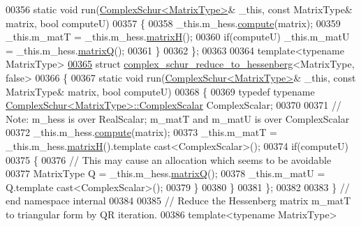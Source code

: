 \begin{DoxyCode}
00356   \textcolor{keyword}{static} \textcolor{keywordtype}{void} run(\hyperlink{group___eigenvalues___module}{ComplexSchur<MatrixType>}& \_this, \textcolor{keyword}{const} MatrixType& matrix, \textcolor{keywordtype}{bool} 
      computeU)
00357   \{
00358     \_this.m\_hess.\hyperlink{group___eigenvalues___module_a239a6fd42c57aab3c0b048c47fde3004}{compute}(matrix);
00359     \_this.m\_matT = \_this.m\_hess.\hyperlink{group___eigenvalues___module_a8e781d2e22a2304647bcf0ae913cc8ea}{matrixH}();
00360     \textcolor{keywordflow}{if}(computeU)  \_this.m\_matU = \_this.m\_hess.\hyperlink{group___eigenvalues___module_a346441e4902a58d43d698ac3da6ff791}{matrixQ}();
00361   \}
00362 \};
00363 
00364 \textcolor{keyword}{template}<\textcolor{keyword}{typename} MatrixType>
\hyperlink{struct_eigen_1_1internal_1_1complex__schur__reduce__to__hessenberg_3_01_matrix_type_00_01false_01_4}{00365} \textcolor{keyword}{struct }\hyperlink{struct_eigen_1_1internal_1_1complex__schur__reduce__to__hessenberg}{complex\_schur\_reduce\_to\_hessenberg}<MatrixType, false>
00366 \{
00367   \textcolor{keyword}{static} \textcolor{keywordtype}{void} run(\hyperlink{group___eigenvalues___module}{ComplexSchur<MatrixType>}& \_this, \textcolor{keyword}{const} MatrixType& matrix, \textcolor{keywordtype}{bool} 
      computeU)
00368   \{
00369     \textcolor{keyword}{typedef} \textcolor{keyword}{typename} \hyperlink{group___eigenvalues___module_class_eigen_1_1_complex_schur}{ComplexSchur<MatrixType>::ComplexScalar} 
      ComplexScalar;
00370 
00371     \textcolor{comment}{// Note: m\_hess is over RealScalar; m\_matT and m\_matU is over ComplexScalar}
00372     \_this.m\_hess.\hyperlink{group___eigenvalues___module_a239a6fd42c57aab3c0b048c47fde3004}{compute}(matrix);
00373     \_this.m\_matT = \_this.m\_hess.\hyperlink{group___eigenvalues___module_a8e781d2e22a2304647bcf0ae913cc8ea}{matrixH}().template cast<ComplexScalar>();
00374     \textcolor{keywordflow}{if}(computeU)  
00375     \{
00376       \textcolor{comment}{// This may cause an allocation which seems to be avoidable}
00377       MatrixType Q = \_this.m\_hess.\hyperlink{group___eigenvalues___module_a346441e4902a58d43d698ac3da6ff791}{matrixQ}(); 
00378       \_this.m\_matU = Q.template cast<ComplexScalar>();
00379     \}
00380   \}
00381 \};
00382 
00383 \} \textcolor{comment}{// end namespace internal}
00384 
00385 \textcolor{comment}{// Reduce the Hessenberg matrix m\_matT to triangular form by QR iteration.}
00386 \textcolor{keyword}{template}<\textcolor{keyword}{typename} MatrixType>

\end{DoxyCode}
